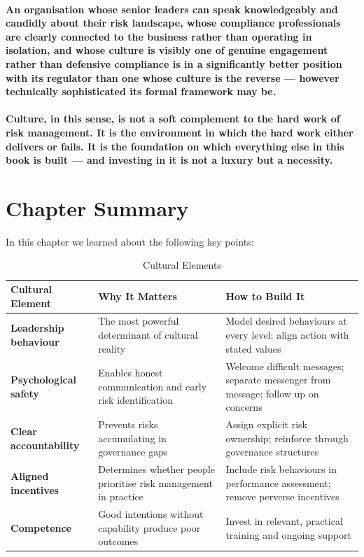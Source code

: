 \paragraph{An organisation whose senior leaders can speak knowledgeably and candidly about their risk landscape, whose compliance professionals are clearly connected to the business rather than operating in isolation, and whose culture is visibly one of genuine engagement rather than defensive compliance is in a significantly better position with its regulator than one whose culture is the reverse — however technically sophisticated its formal framework may be.}
\paragraph{Culture, in this sense, is not a soft complement to the hard work of risk management. It is the environment in which the hard work either delivers or fails. It is the foundation on which everything else in this book is built — and investing in it is not a luxury but a necessity.}

\newpage
\section{Chapter Summary}
In this chapter we learned about the following key points:
\begin{table}[H]
  \centering
  \renewcommand{\arraystretch}{1.5}
  \begin{tabularx}{\textwidth}{ | >{\raggedright\arraybackslash}p{} 
								| >{\raggedright\arraybackslash}p{} 
                                | >{\raggedright\arraybackslash}X | }
    \hline
    \textbf{Cultural Element} & \textbf{Why It Matters} & \textbf{How to Build It} \\
    \hline
    \textbf{Leadership behaviour} & The most powerful determinant of cultural reality & Model desired behaviours at every level; align action with stated values\\
    \hline
    \textbf{Psychological safety} & Enables honest communication and early risk identification & Welcome difficult messages; separate messenger from message; follow up on concerns\\
    \hline
    \textbf{Clear accountability} & Prevents risks accumulating in governance gaps & Assign explicit risk ownership; reinforce through governance structures\\
    \hline
    \textbf{Aligned incentives} & Determines whether people prioritise risk management in practice & Include risk behaviours in performance assessment; remove perverse incentives\\
    \hline
    \textbf{Competence} & Good intentions without capability produce poor outcomes & Invest in relevant, practical training and ongoing support\\
    \hline
  \end{tabularx}
  \caption{Cultural Elements}
\end{table}

